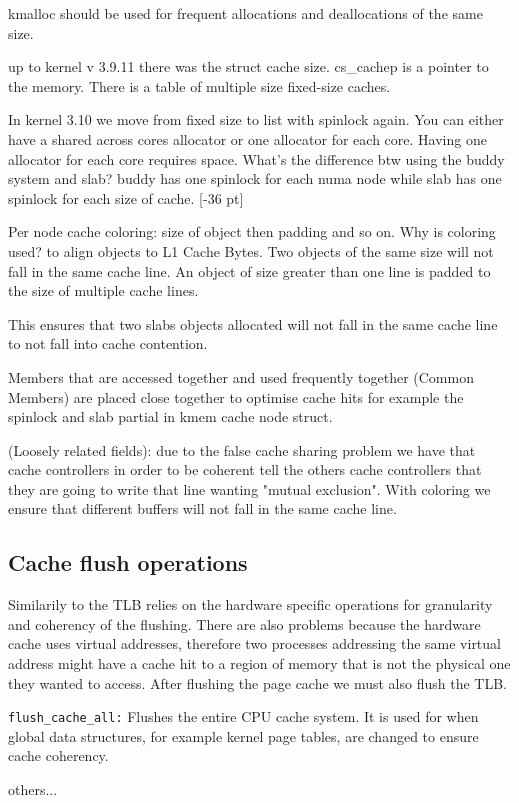 \documentclass[twoside]{article}
\begin{document}
kmalloc should be used for frequent allocations and deallocations of the same size. 

up to kernel v 3.9.11 there was the struct cache size. cs\_cachep is a pointer to the memory. There is a table of multiple size fixed-size caches. 

In kernel 3.10 we move from fixed size to list with spinlock again. You can either have a shared across cores allocator or one allocator for each core. Having one allocator for each core requires space. What's the difference btw using the buddy system and slab? buddy has one spinlock for each numa node while slab has one spinlock for each size of cache. [-36 pt]

Per node cache coloring: size of object then padding and so on. Why is coloring used? to align objects to L1 Cache Bytes. Two objects of the same size will not fall in the same cache line. An object of size greater than one line is padded to the size of multiple cache lines.

This ensures that two slabs objects allocated will not fall in the same cache line to not fall into cache contention.

Members that are accessed together and used frequently together (Common Members) are placed close together to optimise cache hits for example the spinlock and slab partial in kmem cache node struct. 

(Loosely related fields): due to the false cache sharing problem we have that cache controllers in order to be coherent tell the others cache controllers that they are going to write that line wanting "mutual exclusion". With coloring we ensure that different buffers will not fall in the same cache line. 

\subsection{Cache flush operations}

Similarily to the TLB relies on the hardware specific operations for granularity and coherency of the flushing. There are also problems because the hardware cache uses virtual addresses, therefore two processes addressing the same virtual address might have a cache hit to a region of memory that is not the physical one they wanted to access. After flushing the page cache we must also flush the TLB.

\begin{description}
    \item \texttt{flush_cache_all:} Flushes the entire CPU cache system. It is used for when global data structures, for example kernel page tables, are changed to ensure cache coherency.
    \item others...
\end{description}
\end{document}
